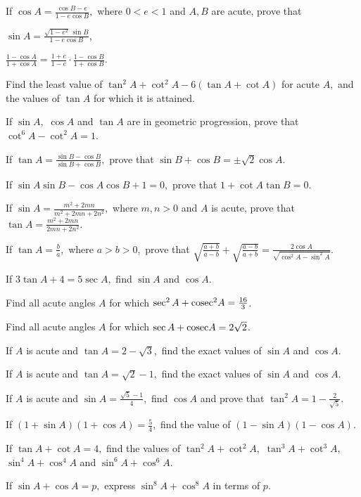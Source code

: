 \item If $\cos A = \frac{\cos B - e}{1 - e\cos B},$ where $0 < e < 1$ and $A, B$ are acute, prove that
  \startitemize[i]
    \item $\sin A = \frac{\sqrt{1 - e^2}\,\sin B}{1 - e\cos B}$,
    \item $\frac{1 - \cos A}{1 + \cos A} = \frac{1 + e}{1 - e}\cdot\frac{1 - \cos B}{1 + \cos B}$.
  \stopitemize
\item Find the least value of $\tan^2 A + \cot^2 A - 6(\tan A + \cot A)$ for acute $A,$ and the values of $\tan A$ for which it is
    attained.
\item If $\sin A,$ $\cos A$ and $\tan A$ are in geometric progression, prove that $\cot^6 A - \cot^2 A = 1$.
\item If $\tan A = \frac{\sin B - \cos B}{\sin B + \cos B},$ prove that $\sin B + \cos B = \pm\sqrt{2}\cos A$.
\item If $\sin A\sin B - \cos A\cos B + 1 = 0,$ prove that $1 + \cot A\tan B = 0$.
\item If $\sin A = \frac{m^2 + 2mn}{m^2 + 2mn + 2n^2},$ where $m, n > 0$ and $A$ is acute, prove that $\tan A = \frac{m^2 +
    2mn}{2mn + 2n^2}$.
\item If $\tan A = \frac{b}{a},$ where $a > b > 0,$ prove that $\sqrt{\frac{a + b}{a - b}} + \sqrt{\frac{a - b}{a + b}} =
    \frac{2\cos A}{\sqrt{\cos^2 A - \sin^2 A}}$.
\item If $3\tan A + 4 = 5\sec A,$ find $\sin A$ and $\cos A$.
\item Find all acute angles $A$ for which $\sec^2 A + {\rm cosec}^2 A = \frac{16}{3}$.
\item Find all acute angles $A$ for which $\sec A + {\rm cosec} A = 2\sqrt{2}$.
\item If $A$ is acute and $\tan A = 2 - \sqrt{3},$ find the exact values of $\sin A$ and $\cos A$.
\item If $A$ is acute and $\tan A = \sqrt{2} - 1,$ find the exact values of $\sin A$ and $\cos A$.
\item If $A$ is acute and $\sin A = \frac{\sqrt{5} - 1}{4},$ find $\cos A$ and prove that $\tan^2 A = 1 - \frac{2}{\sqrt{5}}$.
\item If $(1 + \sin A)(1 + \cos A) = \frac{5}{4},$ find the value of $(1 - \sin A)(1 - \cos A)$.
\item If $\tan A + \cot A = 4,$ find the values of $\tan^2 A + \cot^2 A,$ $\tan^3 A + \cot^3 A,$ $\sin^4 A + \cos^4 A$ and $\sin^6 A
    + \cos^6 A$.
\item If $\sin A + \cos A = p,$ express $\sin^8 A + \cos^8 A$ in terms of $p$.
